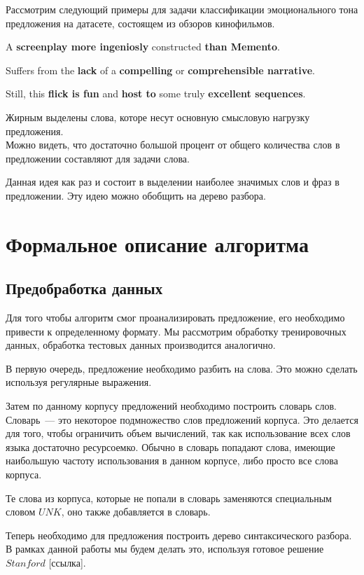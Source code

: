 Рассмотрим следующий примеры для задачи классификации эмоционального тона предложения на датасете, состоящем из
обзоров кинофильмов.

{\selectfont A \textbf{screenplay more ingeniosly} constructed \textbf{than Memento}.}

{\selectfont Suffers from the \textbf{lack} of a \textbf{compelling} or \textbf{comprehensible narrative}.}

{\selectfont Still, this \textbf{flick is fun} and \textbf{host to} some truly \textbf{excellent sequences}.}

\noindent Жирным выделены слова, которе несут основную смысловую нагрузку предложения.\\
Можно видеть, что достаточно большой процент от общего количества слов в предложении составляют 
 для задачи слова.

Данная идея как раз и состоит в выделении наиболее значимых слов и фраз в предложении.
Эту идею можно обобщить на дерево разбора.

\section{Формальное описание алгоритма} \label{formal}

\subsection{Предобработка данных} \label{prework}
Для того чтобы алгоритм смог проанализировать предложение, 
его необходимо привести к определенному формату. Мы рассмотрим обработку
тренировочных данных, обработка тестовых данных производится аналогично.

В первую очередь, предложение необходимо разбить на слова. 
Это можно сделать используя регулярные выражения. 

Затем по данному корпусу предложений необходимо построить словарь слов.
Словарь~--- это некоторое подмножество слов предложений корпуса.
Это делается для того, чтобы ограничить объем вычислений, так как использование всех
слов языка достаточно ресурсоемко. Обычно в словарь попадают слова, 
имеющие наибольшую частоту использования в данном корпусе, 
либо просто все слова корпуса.

Те слова из корпуса, которые не попали в словарь заменяются специальным словом $UNK$, 
оно также добавляется в словарь.

Теперь необходимо для предложения построить дерево синтаксического разбора.
В рамках данной работы мы будем делать это, используя готовое решение $Stanford$ [ссылка].

